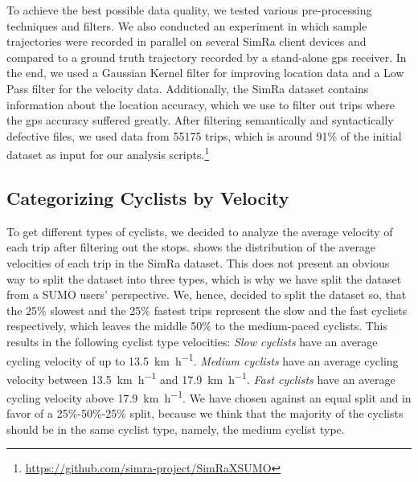 To achieve the best possible data quality, we tested various pre-processing techniques and filters.
We also conducted an experiment in which sample trajectories were recorded in parallel on several SimRa client devices and compared to a ground truth trajectory recorded by a stand-alone \ac{gps} receiver.
In the end, we used a Gaussian Kernel filter for improving location data and a Low Pass filter for the velocity data.
Additionally, the SimRa dataset contains information about the location accuracy, which we use to filter out trips where the \ac{gps} accuracy suffered greatly.
After filtering semantically and syntactically defective files, we used data from \num{55175} trips, which is around \num{91}\% of the initial dataset as input for our analysis scripts.\footnote{\url{https://github.com/simra-project/SimRaXSUMO}}
\subsection{Categorizing Cyclists by Velocity}
\label{subsec:categorizing_by_velocity_preprocessing}
To get different types of cyclists, we decided to analyze the average velocity of each trip after filtering out the stops.
 shows the distribution of the average velocities of each trip in the SimRa dataset.
This does not present an obvious way to split the dataset into three types, which is why we have split the dataset from a SUMO users' perspective.
We, hence, decided to split the dataset so, that the \num{25}\% slowest and the \num{25}\% fastest trips represent the slow and the fast cyclists respectively, which leaves the middle \num{50}\% to the medium-paced cyclists.
This results in the following cyclist type velocities:
\textit{Slow cyclists} have an average cycling velocity of up to \SI{13.5}{\km\per\hour}.
\textit{Medium cyclists} have an average cycling velocity between \SI{13.5}{\km\per\hour} and \SI{17.9}{\km\per\hour}.
\textit{Fast cyclists} have an average cycling velocity above \SI{17.9}{\km\per\hour}.
We have chosen against an equal split and in favor of a \num{25}\%-\num{50}\%-\num{25}\% split, because we think that the majority of the cyclists should be in the same cyclist type, namely, the medium cyclist type.

